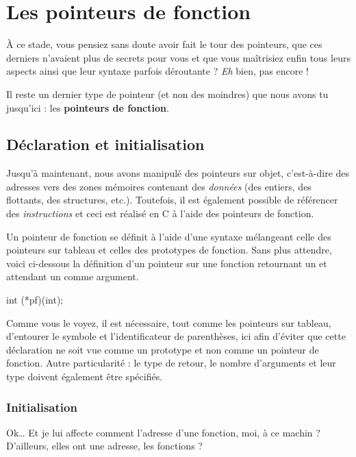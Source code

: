 \chapter{Les pointeurs de fonction}
\label{les-pointeurs-de-fonction}

À ce stade, vous pensiez sans doute avoir fait le tour des
  pointeurs, que ces derniers n'avaient plus de secrets pour vous et que
  vous maîtrisiez enfin tous leurs aspects ainsi que leur syntaxe
  parfois déroutante ? \emph{Eh} bien, pas encore !

Il reste un dernier type de pointeur (et non des moindres) que nous
avons tu jusqu'ici : les \textbf{pointeurs de fonction}.

\section{Déclaration et initialisation}
\label{declaration-et-initialisation-3}

Jusqu’à maintenant, nous avons manipulé des pointeurs sur objet, 
c'est-à-dire des adresses vers des zones mémoires contenant des 
\emph{données} (des entiers, des flottants, des structures, etc.). 
Toutefois, il est également possible de référencer des \emph{instructions} 
et ceci est réalisé en C à l'aide des pointeurs de fonction.

Un pointeur de fonction se définit à l'aide d'une syntaxe mélangeant
celle des pointeurs sur tableau et celles des prototypes de fonction.
Sans plus attendre, voici ci-dessous la définition d'un pointeur sur une
fonction retournant un  et attendant un  comme
argument.

\begin{C}
int (*pf)(int);
\end{C}

Comme vous le voyez, il est nécessaire, tout comme les pointeurs sur
tableau, d'entourer le symbole \mybox{*} et l'identificateur de
parenthèses, ici afin d'éviter que cette déclaration ne soit vue comme
un prototype et non comme un pointeur de fonction. Autre particularité :
le type de retour, le nombre d'arguments et leur type doivent également
être spécifiés.

\subsection{Initialisation}
\label{initialisation-7}

\begin{questionbox} 
 Ok\ldots{} Et je lui affecte comment
l'adresse d'une fonction, moi, à ce machin ? D'ailleurs, elles ont une
adresse, les fonctions ?
\end{questionbox}

